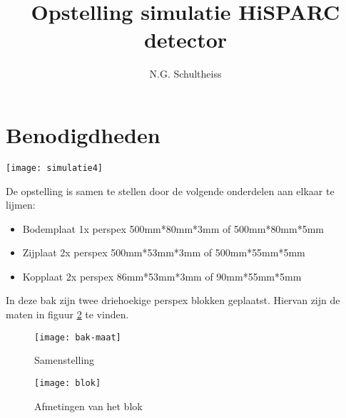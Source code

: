 



\title{Opstelling simulatie HiSPARC detector}
\author{N.G. Schultheiss}
\date{}

\maketitle
\thispagestyle{firststyle}

\section{Benodigdheden}

\noindent \begin{center}
\texttt{[image: simulatie4]}
\par\end{center}

De opstelling is samen te stellen door de volgende onderdelen aan
elkaar te lijmen:
\begin{itemize}
\item Bodemplaat 1x perspex 500mm{*}80mm{*}3mm of 500mm{*}80mm{*}5mm
\item Zijplaat 2x perspex 500mm{*}53mm{*}3mm of 500mm{*}55mm{*}5mm
\item Kopplaat 2x perspex 86mm{*}53mm{*}3mm of 90mm{*}55mm{*}5mm
\end{itemize}
In deze bak zijn twee driehoekige perspex blokken geplaatst. Hiervan
zijn de maten in figuur \ref{fig:blok} te vinden.


\begin{figure}
\begin{centering} \label{fig:bak-maat}
\texttt{[image: bak-maat]}
\par\end{centering}

\caption{Samenstelling}
\end{figure}


\begin{figure}
\noindent \begin{centering} \label{fig:blok}
\texttt{[image: blok]}
\par\end{centering}

\caption{Afmetingen van het blok}

\end{figure}


